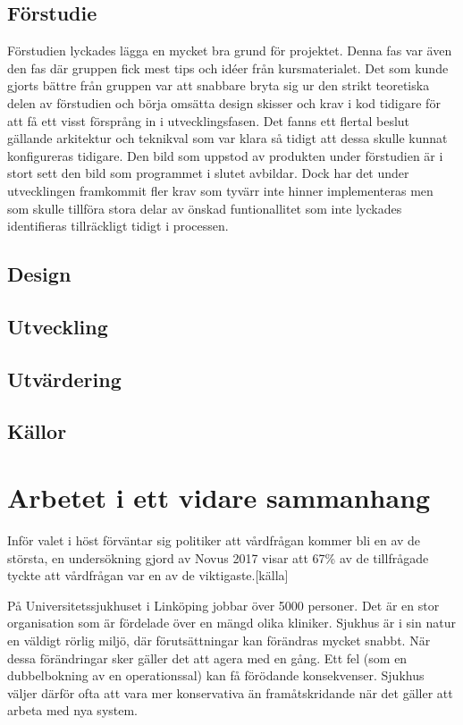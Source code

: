\subsection{Förstudie}
Förstudien lyckades lägga en mycket bra grund för projektet. Denna fas var även den fas där gruppen fick mest tips och idéer från kursmaterialet. Det som kunde gjorts bättre från gruppen var att snabbare bryta sig ur den strikt teoretiska delen av förstudien och börja omsätta design skisser och krav i kod tidigare för att få ett visst försprång in i utvecklingsfasen. Det fanns ett flertal beslut gällande arkitektur och teknikval som var klara så tidigt att dessa skulle kunnat konfigureras tidigare. Den bild som uppstod av produkten under förstudien är i stort sett den bild som programmet i slutet avbildar. Dock har det under utvecklingen framkommit fler krav som tyvärr inte hinner implementeras men som skulle tillföra stora delar av önskad funtionallitet som inte lyckades identifieras tillräckligt tidigt i processen.

\subsection{Design}
\subsection{Utveckling}
\subsection{Utvärdering}
\subsection{Källor}


\section{Arbetet i ett vidare sammanhang}
Inför valet i höst förväntar sig politiker att vårdfrågan kommer bli en av de största, en undersökning gjord av Novus 2017 visar att 67\% av de tillfrågade tyckte att vårdfrågan var en av de viktigaste.[källa]

På Universitetssjukhuset i Linköping jobbar över 5000 personer. Det är en stor organisation som är fördelade över en mängd olika kliniker. Sjukhus är i sin natur en väldigt rörlig miljö, där förutsättningar kan förändras mycket snabbt. När dessa förändringar sker gäller det att agera med en gång. Ett fel (som en dubbelbokning av en operationssal) kan få förödande konsekvenser. Sjukhus väljer därför ofta att vara mer konservativa än framåtskridande när det gäller att arbeta med nya system.

